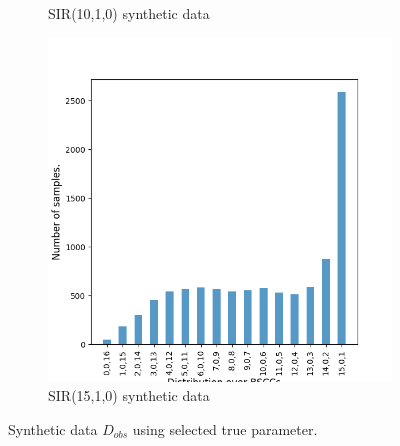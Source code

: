 \begin{figure}[H]
\begin{subfigure}{0.3\textwidth}
        \caption{SIR(10,1,0) synthetic data}
    \end{subfigure}
    \hfill
    \begin{subfigure}{0.3\textwidth}
        \centering
        \includegraphics[width=\linewidth]{figures/sir1510_data.png}
        \caption{SIR(15,1,0) synthetic data}
    \end{subfigure}
    \caption{Synthetic data $D_{obs}$ using selected true parameter.}
\end{figure}

